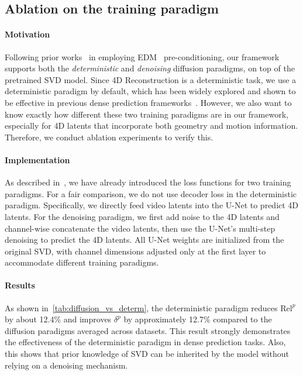 \subsection{Ablation on the training paradigm}

\paragraph{Motivation}
Following prior works~\cite{hu2024-DepthCrafter,xu2025geometrycrafter} in employing EDM~\cite{karras2022elucidating} pre-conditioning, our framework supports both the \textit{deterministic} and \textit{denoising} diffusion paradigms, on top of the pretrained SVD model.
Since 4D Reconstruction is a deterministic task, we use a deterministic paradigm by default, which has been widely explored and shown to be effective in previous dense prediction frameworks~\cite{xu2024matters, song2025depthmaster, xu2025geometrycrafter}.
However, we also want to know exactly how different these two training paradigms are in our framework, especially for 4D latents that incorporate both geometry and motion information. Therefore, we conduct ablation experiments to verify this.

\paragraph{Implementation}
As described in~, we have already introduced the loss functions for two training paradigms. For a fair comparison, we do not use decoder loss in the deterministic paradigm. Specifically, we directly feed video latents into the U-Net to predict 4D latents. For the denoising paradigm, we first add noise to the 4D latents and channel-wise concatenate the video latents, then use the U-Net's multi-step denoising to predict the 4D latents. All U-Net weights are initialized from the original SVD, with channel dimensions adjusted only at the first layer to accommodate different training paradigms.

\paragraph{Results}
As shown in~\cref{tab:diffusion_vs_determ},  the deterministic paradigm reduces $\text{Rel}^{p}$ by about 12.4\% and improves $\delta^{p}$ by approximately 12.7\% compared to the diffusion paradigms averaged across datasets. 
This result strongly demonstrates the effectiveness of the deterministic paradigm in dense prediction tasks. Also, this shows that prior knowledge of SVD can be inherited by the model without relying on a denoising mechanism.

